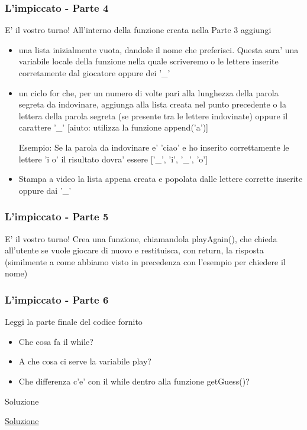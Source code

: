 \begin{frame}[fragile]
	\frametitle{L'impiccato - Parte 4}

	\begin{block}{E' il vostro turno!}
		All'interno della funzione creata nella Parte 3 aggiungi
		    \begin{itemize}
			    \item una lista inizialmente vuota, dandole il nome che preferisci. Questa sara' una variabile locale della funzione nella quale scriveremo o le lettere inserite corretamente dal giocatore oppure dei '\_'
			    \item un ciclo for che, per un numero di volte pari alla lunghezza della parola segreta da indovinare, aggiunga alla lista creata nel punto precedente o la lettera della parola segreta (se presente tra le lettere indovinate) oppure il carattere '\_' [aiuto: utilizza la funzione append('a')]

				    Esempio: Se la parola da indovinare e' 'ciao' e ho inserito correttamente le lettere 'i o' il risultato dovra' essere ['\_', 'i', '\_', 'o']
			    \item Stampa a video la lista appena creata e popolata dalle lettere corrette inserite oppure dai '\_'
		    \end{itemize}
	\end{block}
\end{frame}

\begin{frame}[fragile]
	\frametitle{L'impiccato - Parte 5}

	\begin{block}{E' il vostro turno!}
		Crea una funzione, chiamandola playAgain(), che chieda all'utente se vuole giocare di nuovo e restituisca, con return, la risposta (similmente a come abbiamo visto in precedenza con l'esempio per chiedere il nome)
	\end{block}
\end{frame}

\begin{frame}[fragile]
	\frametitle{L'impiccato - Parte 6}

	\begin{block}{Leggi la parte finale del codice fornito}
		\begin{itemize}
			\item Che cosa fa il while?
			\item A che cosa ci serve la variabile play?
			\item Che differenza c'e' con il while dentro alla funzione getGuess()?
		\end{itemize}
	\end{block}
\end{frame}

\begin{frame}{Soluzione}
	\begin{center}
		\href{https://raw.githubusercontent.com/ragazzedigitalicesena/slide-2019/master/tex/chapter_5-8/hangman_solution.py}{Soluzione}
	\end{center}
\end{frame}{}
